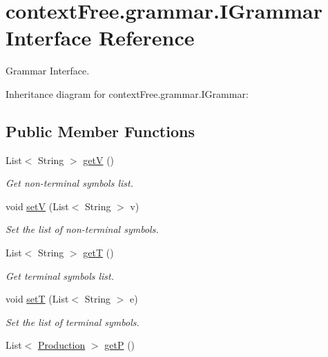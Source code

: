 \hypertarget{interfacecontext_free_1_1grammar_1_1_i_grammar}{\section{context\-Free.\-grammar.\-I\-Grammar Interface Reference}
\label{interfacecontext_free_1_1grammar_1_1_i_grammar}
}


Grammar Interface.  




Inheritance diagram for context\-Free.\-grammar.\-I\-Grammar\-:
\subsection*{Public Member Functions}
\begin{DoxyCompactItemize}
\item 
List$<$ String $>$ \hyperlink{interfacecontext_free_1_1grammar_1_1_i_grammar_a4b1bc2134e63051dc37e693294aaeec6}{get\-V} ()
\begin{DoxyCompactList}\small\item\em Get non-\/terminal symbols list. \end{DoxyCompactList}\item 
void \hyperlink{interfacecontext_free_1_1grammar_1_1_i_grammar_ae7bd17123ad7424af06a7da75a6bc745}{set\-V} (List$<$ String $>$ v)
\begin{DoxyCompactList}\small\item\em Set the list of non-\/terminal symbols. \end{DoxyCompactList}\item 
List$<$ String $>$ \hyperlink{interfacecontext_free_1_1grammar_1_1_i_grammar_a996f5e0bed5a6ac469b764f56d420fb1}{get\-T} ()
\begin{DoxyCompactList}\small\item\em Get terminal symbols list. \end{DoxyCompactList}\item 
void \hyperlink{interfacecontext_free_1_1grammar_1_1_i_grammar_a775125de1388036059da1860ae61a100}{set\-T} (List$<$ String $>$ e)
\begin{DoxyCompactList}\small\item\em Set the list of terminal symbols. \end{DoxyCompactList}\item 
List$<$ \hyperlink{classcontext_free_1_1grammar_1_1_production}{Production} $>$ \hyperlink{interfacecontext_free_1_1grammar_1_1_i_grammar_a629ab4dc36a869b93fa239a3fee760f9}{get\-P} ()

\end{DoxyCompactItemize}

